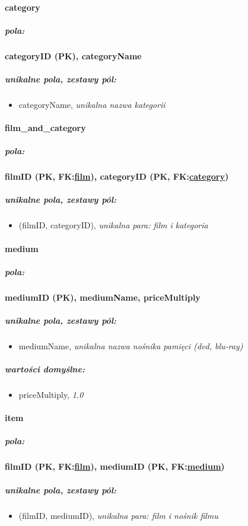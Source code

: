 \documentclass[12pt,a4paper,titlepage]{article}
\begin{document}
\paragraph{category}
\subparagraph{pola:}
\textbf{categoryID (PK), categoryName}
\subparagraph{unikalne pola, zestawy pól:}
\begin{itemize}
	\item categoryName, \textit{unikalna nazwa kategorii}
\end{itemize}

\paragraph{film\_and\_category}
\subparagraph{pola:}
\textbf{filmID (PK, FK:\underline{film}), categoryID (PK, FK:\underline{category})}
\subparagraph{unikalne pola, zestawy pól:}
\begin{itemize}
	\item (filmID, categoryID), \textit{unikalna para: film i kategoria}
\end{itemize}

\newpage

\paragraph{medium}
\subparagraph{pola:}
\textbf{mediumID (PK), mediumName, priceMultiply}
\subparagraph{unikalne pola, zestawy pól:}
\begin{itemize}
	\item mediumName, \textit{unikalna nazwa nośnika pamięci (dvd, blu-ray)}
\end{itemize}
\subparagraph{wartości domyślne:}
\begin{itemize}
	\item priceMultiply, \textit{1.0}
\end{itemize}

\paragraph{item}
\subparagraph{pola:}
\textbf{filmID (PK, FK:\underline{film}), mediumID (PK, FK:\underline{medium})}
\subparagraph{unikalne pola, zestawy pól:}
\begin{itemize}
	\item (filmID, mediumID), \textit{unikalna para: film i nośnik filmu}
\end{itemize}
\end{document}
